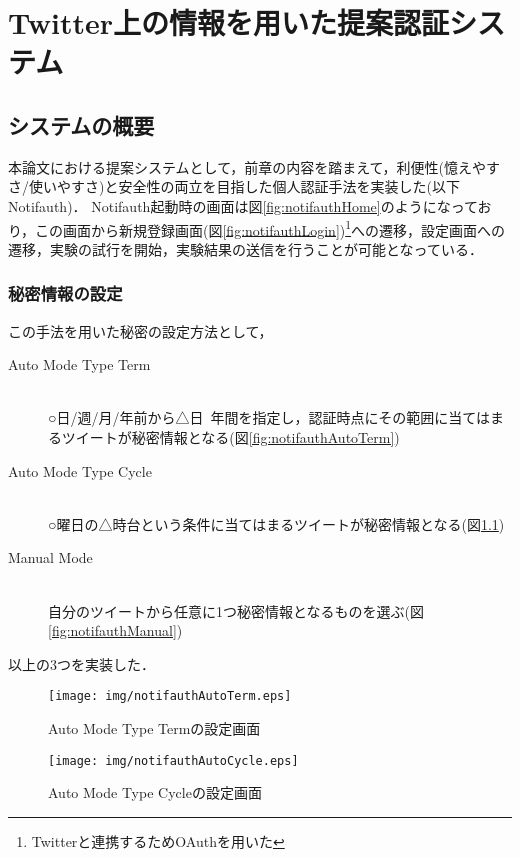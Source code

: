 \chapter{Twitter上の情報を用いた提案認証システム}\label{chap:system}
\section{システムの概要}
本論文における提案システムとして，前章の内容を踏まえて，利便性(憶えやすさ/使いやすさ)と安全性の両立を目指した個人認証手法を実装した(以下Notifauth)．
Notifauth起動時の画面は図\ref{fig:notifauthHome}のようになっており，この画面から新規登録画面(図\ref{fig:notifauthLogin})\footnote{Twitterと連携するためOAuthを用いた}への遷移，設定画面への遷移，実験の試行を開始，実験結果の送信を行うことが可能となっている．

\subsection{秘密情報の設定}\label{subsec:selectSecret}
この手法を用いた秘密の設定方法として，
\begin{description}
  \item[Auto Mode Type Term]\mbox{}\\
    ○日/週/月/年前から△日~年間を指定し，認証時点にその範囲に当てはまるツイートが秘密情報となる(図\ref{fig:notifauthAutoTerm})
  \item[Auto Mode Type Cycle]\mbox{}\\
    ○曜日の△時台という条件に当てはまるツイートが秘密情報となる(図\ref{fig:notifauthAutoCycle})
  \item[Manual Mode]\mbox{}\\
    自分のツイートから任意に1つ秘密情報となるものを選ぶ(図\ref{fig:notifauthManual})
\end{description}
以上の3つを実装した．

\begin{figure}[ht]
  \begin{minipage}{0.5\hsize}
    \begin{center}
      \texttt{[image: img/notifauthAutoTerm.eps]}
    \end{center}
    \caption{Auto Mode Type Termの設定画面}
    \label{fig:notifauthAutoTerm}
  \end{minipage}
  \begin{minipage}{0.5\hsize}
    \begin{center}
      \texttt{[image: img/notifauthAutoCycle.eps]}
    \end{center}
    \caption{Auto Mode Type Cycleの設定画面}
    \label{fig:notifauthAutoCycle}
  \end{minipage}
\end{figure}

